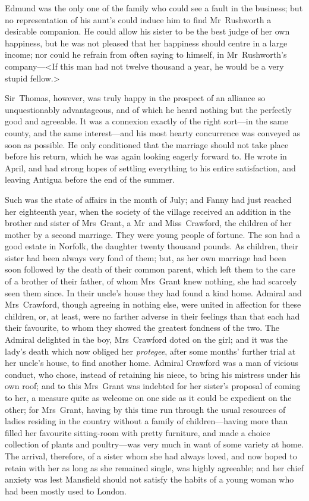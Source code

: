 Edmund was the only one of the family who could see a fault in the business; but no representation of his aunt's could induce him to find Mr~Rushworth a desirable companion. He could allow his sister to be the best judge of her own happiness, but he was not pleased that her happiness should centre in a large income; nor could he refrain from often saying to himself, in Mr~Rushworth's company—<If this man had not twelve thousand a year, he would be a very stupid fellow.>

Sir~Thomas, however, was truly happy in the prospect of an alliance so unquestionably advantageous, and of which he heard nothing but the perfectly good and agreeable. It was a connexion exactly of the right sort—in the same county, and the same interest—and his most hearty concurrence was conveyed as soon as possible. He only conditioned that the marriage should not take place before his return, which he was again looking eagerly forward to. He wrote in April, and had strong hopes of settling everything to his entire satisfaction, and leaving Antigua before the end of the summer.

Such was the state of affairs in the month of July; and Fanny had just reached her eighteenth year, when the society of the village received an addition in the brother and sister of Mrs~Grant, a Mr~and Miss~Crawford, the children of her mother by a second marriage. They were young people of fortune. The son had a good estate in Norfolk, the daughter twenty thousand pounds. As children, their sister had been always very fond of them; but, as her own marriage had been soon followed by the death of their common parent, which left them to the care of a brother of their father, of whom Mrs~Grant knew nothing, she had scarcely seen them since. In their uncle's house they had found a kind home. Admiral and Mrs~Crawford, though agreeing in nothing else, were united in affection for these children, or, at least, were no farther adverse in their feelings than that each had their favourite, to whom they showed the greatest fondness of the two. The Admiral delighted in the boy, Mrs~Crawford doted on the girl; and it was the lady's death which now obliged her \textit{protegee}, after some months' further trial at her uncle's house, to find another home. Admiral Crawford was a man of vicious conduct, who chose, instead of retaining his niece, to bring his mistress under his own roof; and to this Mrs~Grant was indebted for her sister's proposal of coming to her, a measure quite as welcome on one side as it could be expedient on the other; for Mrs~Grant, having by this time run through the usual resources of ladies residing in the country without a family of children—having more than filled her favourite sitting-room with pretty furniture, and made a choice collection of plants and poultry—was very much in want of some variety at home. The arrival, therefore, of a sister whom she had always loved, and now hoped to retain with her as long as she remained single, was highly agreeable; and her chief anxiety was lest Mansfield should not satisfy the habits of a young woman who had been mostly used to London.

